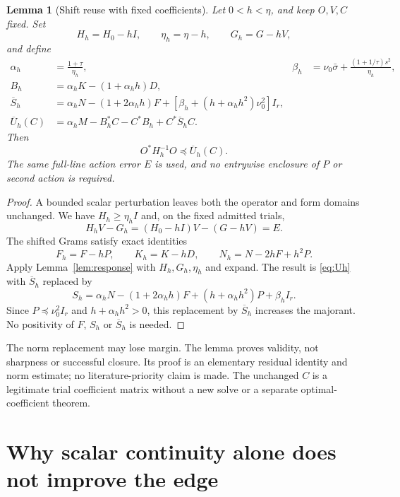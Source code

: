 \documentclass[11pt,a4paper]{article}
\newcommand{\Id}{I}
\newtheorem{lemma}[theorem]{Lemma}
\theoremstyle{definition}
\theoremstyle{remark}
\numberwithin{equation}{section}
\begin{document}
\begin{lemma}[Shift reuse with fixed coefficients]\label{lem:shift}
Let \(0<h<\eta\), and keep \(O,V,C\) fixed. Set
\[
 H_h=H_0-h\Id,\qquad \eta_h=\eta-h,\qquad G_h=G-hV,
\]
and define
\begin{align}
 \alpha_h&=\frac{1+\tau}{\eta_h},&
 \beta_h&=\nu_0\bar\sigma+\frac{(1+1/\tau)s^2}{\eta_h},\label{eq:alphabeta}\\
 B_h&=\alpha_h K-(1+\alpha_h h)D,\label{eq:Bh}\\
 \overline S_h&=\alpha_h N-(1+2\alpha_h h)F
       +[\beta_h+(h+\alpha_h h^2)\nu_0^2]I_r,\label{eq:Sh}\\
 \overline U_h(C)&=\alpha_h M-B_h^*C-C^*B_h
                         +C^*\overline S_hC.\label{eq:Uh}
\end{align}
Then
\begin{equation}\label{eq:response-shift}
 O^*H_h^{-1}O\preceq\overline U_h(C).
\end{equation}
The same full-line action error \(E\) is used, and no entrywise enclosure
of \(P\) or second action is required.
\end{lemma}
\begin{proof}
A bounded scalar perturbation leaves both the operator and form domains
unchanged. We have \(H_h\ge\eta_h\Id\) and, on the fixed admitted trials,
\begin{equation}\label{eq:same-error}
 H_hV-G_h=(H_0-h\Id)V-(G-hV)=E.
\end{equation}
The shifted Grams satisfy exact identities
\[
 F_h=F-hP,\qquad K_h=K-hD,\qquad
 N_h=N-2hF+h^2P.
\]
Apply Lemma~\ref{lem:response} with \(H_h,G_h,\eta_h\) and expand.
The result is \eqref{eq:Uh} with \(\overline S_h\) replaced by
\[
 S_h=\alpha_h N-(1+2\alpha_h h)F+
             (h+\alpha_h h^2)P+\beta_h I_r.
\]
Since \(P\preceq\nu_0^2 I_r\) and \(h+\alpha_h h^2>0\), this replacement
by \(\overline S_h\) increases the majorant. No positivity of \(F\),
\(S_h\) or \(\overline S_h\) is needed.
\end{proof}

The norm replacement may lose margin. The lemma proves validity, not
sharpness or successful closure. Its proof is an elementary residual
identity and norm estimate; no literature-priority claim is made.
The unchanged \(C\) is a legitimate trial coefficient matrix without
a new solve or a separate optimal-coefficient theorem.

\section{Why scalar continuity alone does not improve the edge}\label{sec:scalar}
\end{document}
